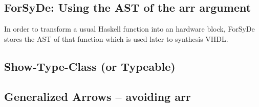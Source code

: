 \documentclass[11pt,final,a4paper]{article}
\begin{document}
\subsection{ForSyDe: Using the AST of the arr argument}

In order to transform a usual Haskell function into an hardware block, ForSyDe stores the AST of that function which is
used later to synthesis VHDL.  \subsection{Show-Type-Class (or Typeable)}

\subsection{Generalized Arrows -- avoiding arr}




\end{document}
